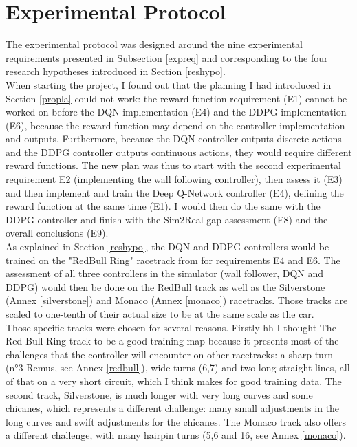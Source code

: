 
\chapter{Experimental Protocol} %

\label{Chapter6} %



The experimental protocol was designed around the nine experimental requirements presented in Subsection \ref{expreq} and corresponding to the four research hypotheses introduced in Section \ref{reshypo}. \\
When starting the project, I found out that the planning I had introduced in Section \ref{propla} could not work: the reward function requirement (E1) cannot be worked on before the DQN implementation (E4) and the DDPG implementation (E6), because the reward function may depend on the controller implementation and outputs. Furthermore, because the DQN controller outputs discrete actions and the DDPG controller outputs continuous actions, they would require different reward functions. The new plan was thus to start with the second experimental requirement E2 (implementing the wall following controller), then assess it (E3) and then implement and train the Deep Q-Network controller (E4), defining the reward function at the same time (E1). I would then do the same with the DDPG controller and finish with the Sim2Real gap assessment (E8) and the overall conclusions (E9). \\
As explained in Section \ref{reshypo}, the DQN and DDPG controllers would be trained on the "RedBull Ring" racetrack from \cite{bosello} for requirements E4 and E6. The assessment of all three controllers in the simulator (wall follower, DQN and DDPG) would then be done on the RedBull track as well as the Silverstone (Annex \ref{silverstone}) and Monaco (Annex \ref{monaco}) racetracks. Those tracks are scaled to one-tenth of their actual size to be at the same scale as the car. \\
Those specific tracks were chosen for several reasons. Firstly hh I thought The Red Bull Ring track to be a good training map because it presents most of the challenges that the controller will encounter on other racetracks: a sharp turn (n°3 Remus, see Annex \ref{redbull}), wide turns (6,7) and two long straight lines, all of that on a very short circuit, which I think makes for good training data. The second track, Silverstone, is much longer with very long curves and some chicanes, which represents a different challenge: many small adjustments in the long curves and swift adjustments for the chicanes. The Monaco track also offers a different challenge, with many hairpin turns (5,6 and 16, see Annex \ref{monaco}). \\
